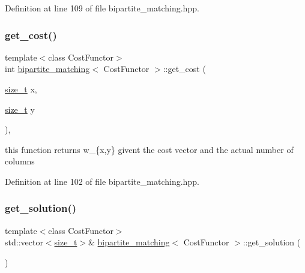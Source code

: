 Definition at line 109 of file bipartite\+\_\+matching.\+hpp.

\mbox{\label{classbipartite__matching_a7599b38138e3978176b4e12338e4eba3}} 
\subsubsection{\texorpdfstring{get\+\_\+cost()}{get\_cost()}}
{\footnotesize\ttfamily template$<$class Cost\+Functor$>$ \\
int \hyperlink{classbipartite__matching}{bipartite\+\_\+matching}$<$ Cost\+Functor $>$\+::get\+\_\+cost (\begin{DoxyParamCaption}\item[{\hyperlink{tutorial__fpt__2017_2intro_2sixth_2test_8c_a7c94ea6f8948649f8d181ae55911eeaf}{size\+\_\+t}}]{x,  }\item[{\hyperlink{tutorial__fpt__2017_2intro_2sixth_2test_8c_a7c94ea6f8948649f8d181ae55911eeaf}{size\+\_\+t}}]{y }\end{DoxyParamCaption})\hspace{0.3cm}{\ttfamily [inline]}, {\ttfamily [private]}}



this function returns w\+\_\+\{x,y\} givent the cost vector and the actual number of columns 



Definition at line 102 of file bipartite\+\_\+matching.\+hpp.

\mbox{\label{classbipartite__matching_a51acadff82a7c5fc203dc401c4652223}} 
\subsubsection{\texorpdfstring{get\+\_\+solution()}{get\_solution()}}
{\footnotesize\ttfamily template$<$class Cost\+Functor$>$ \\
std\+::vector$<$\hyperlink{tutorial__fpt__2017_2intro_2sixth_2test_8c_a7c94ea6f8948649f8d181ae55911eeaf}{size\+\_\+t}$>$\& \hyperlink{classbipartite__matching}{bipartite\+\_\+matching}$<$ Cost\+Functor $>$\+::get\+\_\+solution (\begin{DoxyParamCaption}{ }\end{DoxyParamCaption})\hspace{0.3cm}{\ttfamily [inline]}}



